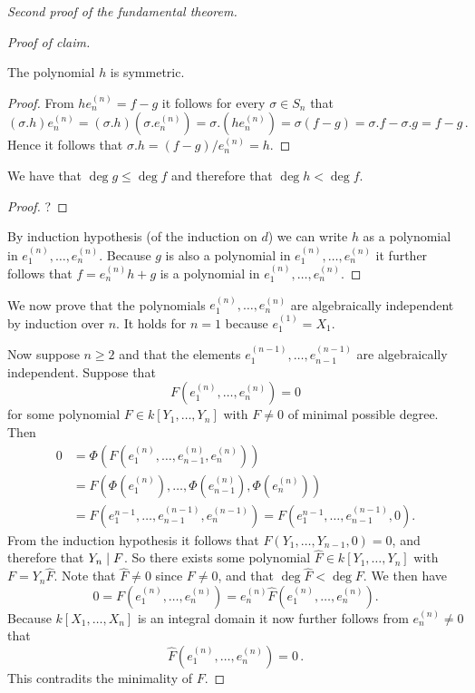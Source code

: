 \begin{proof}[Second proof of the fundamental theorem]
\begin{proof}[Proof of claim]
    \begin{claim}
      The polynomial $h$ is symmetric.
    \end{claim}
    \begin{proof}
      From $h e^{(n)}_n = f-g$ it follows for every $\sigma \in S_n$ that
      \[
          (\sigma.h) e^{(n)}_n
        = (\sigma.h) (\sigma.e^{(n)}_n)
        = \sigma.(h e^{(n)}_n)
        = \sigma(f-g)
        = \sigma.f - \sigma.g
        = f - g \,.
      \]
      Hence it follows that $\sigma.h = (f-g)/e^{(n)}_n = h$.
    \end{proof}
    
    \begin{claim}
      We have that $\deg g \leq \deg f$ and therefore that $\deg h < \deg f$.
    \end{claim}
    \begin{proof}
      ?
    \end{proof}
    
    By induction hypothesis (of the induction on $d$) we can write $h$ as a polynomial in $e^{(n)}_1, \dotsc, e^{(n)}_n$.
    Because $g$ is also a polynomial in $e^{(n)}_1, \dotsc, e^{(n)}_n$ it further follows that $f = e^{(n)}_n h + g$ is a polynomial in $e^{(n)}_1, \dotsc, e^{(n)}_n$.
  \end{proof}
  
  We now prove that the polynomials $e^{(n)}_1, \dotsc, e^{(n)}_n$ are algebraically independent by induction over $n$.
  It holds for $n = 1$ because $e^{(1)}_1 = X_1$.
  
  Now suppose $n \geq 2$ and that the elements $e^{(n-1)}_1, \dotsc, e^{(n-1)}_{n-1}$ are algebraically independent.
  Suppose that
  \[
      F\left(e^{(n)}_1, \dotsc, e^{(n)}_n\right)
    = 0
  \]
  for some polynomial $F \in k[Y_1, \dotsc, Y_n]$ with $F \neq 0$ of minimal possible degree.
  Then
  \begin{align*}
        0
    &=  \Phi \left( F \left( e^{(n)}_1, \dotsc, e^{(n)}_{n-1}, e^{(n)}_n \right) \right) \\
    &=  F \left(
            \Phi\left( e^{(n)}_1 \right),
            \dotsc,
            \Phi\left( e^{(n)}_{n-1} \right),
            \Phi\left( e^{(n)}_n \right)
          \right) \\
    &=  F \left( e^{n-1}_1, \dotsc, e^{(n-1)}_{n-1}, e^{(n-1)}_n \right)
     =  F \left( e^{n-1}_1, \dotsc, e^{(n-1)}_{n-1}, 0 \right).
  \end{align*}
  From the induction hypothesis it follows that $F(Y_1, \dotsc, Y_{n-1}, 0) = 0$, and therefore that $Y_n \mid F$.
  So there exists some polynomial $\hat{F} \in k[Y_1, \dotsc, Y_n]$ with $F = Y_n \hat{F}$.
  Note that $\hat{F} \neq 0$ since $F \neq 0$, and that $\deg \hat{F}  <\deg F$.
  We then have
  \[
      0
    = F\left( e^{(n)}_1, \dotsc, e^{(n)}_n \right)
    = e^{(n)}_n \hat{F}\left( e^{(n)}_1, \dotsc, e^{(n)}_n \right).
  \]
  Because $k[X_1, \dotsc, X_n]$ is an integral domain it now further follows from $e^{(n)}_n \neq 0$ that
  \[
      \hat{F}\left( e^{(n)}_1, \dotsc, e^{(n)}_n \right)
    = 0 \,.
  \]
  This contradits the minimality of $F$.
\end{proof}


